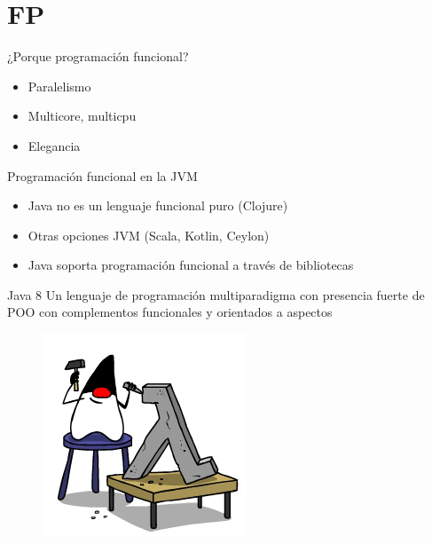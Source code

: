 \documentclass[14pt]{beamer}
\begin{document}
\section{FP}

\begin{frame}{¿Porque programación funcional?}
\begin{itemize}
	\item Paralelismo
	\item Multicore, multicpu
	\item Elegancia
\end{itemize}
\end{frame}

\begin{frame}{Programación funcional en la JVM}
\begin{itemize}
\item Java no es un lenguaje funcional puro (Clojure)
\item Otras opciones JVM (Scala, Kotlin, Ceylon)
\item Java soporta programación funcional a través de bibliotecas
\end{itemize}
\end{frame}


\begin{frame}{Java 8}
Un lenguaje de programación multiparadigma con presencia fuerte de POO con complementos funcionales y orientados a aspectos
\begin{figure}
	\centering
	\includegraphics[width=0.5\linewidth]{Images/JavaLam-1}
\end{figure}
\end{frame}
\end{document}
